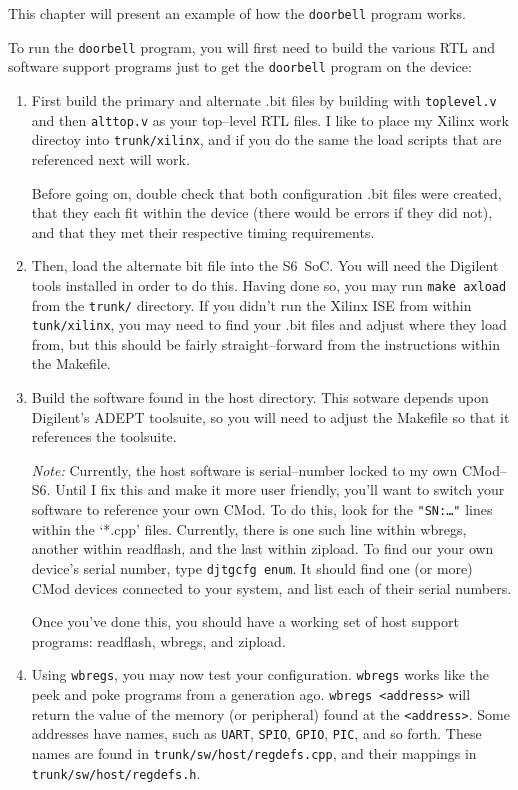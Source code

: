 \documentclass{gqtekspec}
\begin{document}
This chapter will present an example of how the {\tt doorbell} program works.

To run the {\tt doorbell} program, you will first need to build the various
RTL and software support programs just to get the {\tt doorbell} program on
the device:
\begin{enumerate}
\item First build the primary and alternate .bit files by building 
	with {\tt toplevel.v} and then {\tt alttop.v} as your top--level
	RTL files.  I like to place my Xilinx work directoy into
	{\tt trunk/xilinx}, and if you do the same the load scripts that
	are referenced next will work.

	Before going on, double check that both configuration .bit files were
	created, that they each fit within the device (there would be errors
	if they did not), and that they met their respective timing
	requirements.

\item Then, load the alternate bit file into the S6~SoC.  You will need
	the Digilent tools installed in order to do this.  Having done so,
	you may run {\tt make axload} from the {\tt trunk/} directory.
	If you didn't run the Xilinx ISE from within {\tt tunk/xilinx},
	you may need to find your .bit files and adjust where they load
	from, but this should be fairly straight--forward from the instructions
	within the Makefile.
\item Build the software found in the host directory.  This sotware depends
	upon Digilent's ADEPT toolsuite, so you will need to adjust the
	Makefile so that it references the toolsuite.

	{\em Note:} Currently, the host software is serial--number locked to
	my own CMod--S6.  Until I fix this and make it more user friendly,
	you'll want to switch your software to reference your own CMod.
	To do this, look for the {\tt "SN:\ldots"} lines within the `*.cpp'
	files.  Currently, there is one such line within wbregs, another
	within readflash, and the last within zipload.  To find our your own
	device's serial number, type {\tt djtgcfg enum}.  It should find one
	(or more) CMod devices connected to your system, and list each of
	their serial numbers.

	Once you've done this, you should have a working set of host support
	programs: readflash, wbregs, and zipload.

\item Using {\tt wbregs}, you may now test your configuration.  {\tt wbregs}
	works like the peek and poke programs from a generation ago. 
	{\tt wbregs <address>} will return the value of the memory (or
	peripheral) found at the {\tt <address>}.  Some addresses have names,
	such as {\tt UART}, {\tt SPIO}, {\tt GPIO}, {\tt PIC}, and so forth. 
	These names are found in {\tt trunk/sw/host/regdefs.cpp}, and their
	mappings in {\tt trunk/sw/host/regdefs.h}.


\end{enumerate}
\end{document}
